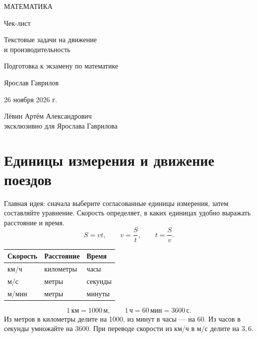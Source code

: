 \documentclass[a4paper,12pt]{article}
\newcommand{\unit}[1]{\,\text{#1}}
\begin{document}
\begin{titlepage}
\centering
\vspace*{28mm}
{\Large\color{darkaccent} МАТЕМАТИКА\par}
\vspace{17mm}
{\Huge Чек-лист\par}
\vspace{11mm}
{\LARGE\color{accent} Текстовые задачи на движение\\[2mm] и производительность\par}
\vspace{18mm}
{\large Подготовка к экзамену по математике\par}
\vfill
{\large Ярослав Гаврилов\par}
\vspace{10mm}
{\large 26 ноября 2026 г.\par}
\vspace{17mm}
{\small Лёвин Артём Александрович\\эксклюзивно для Ярослава Гаврилова\par}
\vspace{17mm}
\vspace{4mm}
\end{titlepage}
\setcounter{page}{1}
\section{Единицы измерения и движение поездов}
Главная идея: сначала выберите согласованные единицы измерения, затем составляйте уравнение. Скорость определяет, в каких единицах удобно выражать расстояние и время.
\[
 S=vt,\qquad v=\frac{S}{t},\qquad t=\frac{S}{v}.
\]
\begin{center}
\begin{tabularx}{\linewidth}{@{}lXX@{}}
\toprule
Скорость & Расстояние & Время\\\midrule
км/ч & километры & часы\\
м/с & метры & секунды\\
м/мин & метры & минуты\\\bottomrule
\end{tabularx}
\end{center}
\[
1\unit{км}=1000\unit{м},\qquad 1\unit{ч}=60\unit{мин}=3600\unit{с}.
\]
Из метров в километры делите на 1000, из минут в часы --- на 60. Из часов в секунды умножайте на 3600. При переводе скорости из км/ч в м/с делите на $3{,}6$.
\end{document}
